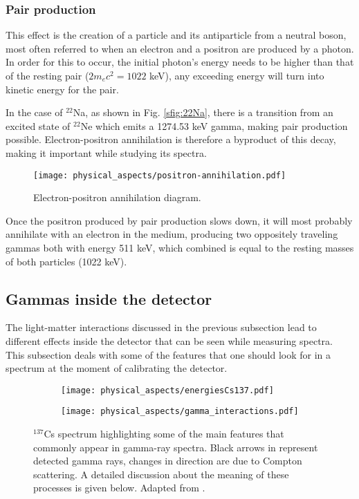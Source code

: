 \subsubsection{Pair production}

This effect is the creation of a particle and its antiparticle from a neutral boson, most often referred to when an electron and a positron are produced by a photon. In order for this to occur, the initial photon's energy needs to be higher than that of the resting pair ($2m_e c^2=1022$ \unit{\kilo\eV}), any exceeding energy will turn into kinetic energy for the pair.

In the case of $^{22}$Na, as shown in Fig. \ref{sfig:22Na}, there is a transition from an excited state of $^{22}$Ne which emits a 1274.53 \unit{\kilo\eV} gamma, making pair production possible. Electron-positron annihilation is therefore a byproduct of this decay, making it important while studying its spectra.

\begin{figure}[H]
  \centering
  \texttt{[image: physical\_aspects/positron-annihilation.pdf]}
  \caption{\label{fig:positron_annihilation_diagram}Electron-positron annihilation diagram.}
\end{figure}

Once the positron produced by pair production slows down, it will most probably annihilate with an electron in the medium, producing two oppositely traveling gammas both with energy 511 \unit{\kilo\eV}, which combined is equal to the resting masses of both particles (1022 \unit{\kilo\eV}).

\subsection{Gammas inside the detector}

The light-matter interactions discussed in the previous subsection lead to different effects inside the detector that can be seen while measuring spectra. This subsection deals with some of the features that one should look for in a spectrum at the moment of calibrating the detector.

\begin{figure}[H]
  \centering
  \begin{subfigure}[t]{0.7\textwidth}
    \texttt{[image: physical\_aspects/energiesCs137.pdf]}
    \caption{\label{sfig:spectrum_description}}
  \end{subfigure}
  \hfill
  \begin{subfigure}[t]{0.28\textwidth}
    \texttt{[image: physical\_aspects/gamma\_interactions.pdf]}
    \caption{\label{sfig:gamma_scattering}}
  \end{subfigure}
  \caption{\label{fig:Cs137_description}$^{137}$Cs spectrum highlighting some of the main features that commonly appear in gamma-ray spectra. Black arrows in  represent detected gamma rays, changes in direction are due to Compton scattering. A detailed discussion about the meaning of these processes is given below. Adapted from \cite{Notas-instrumentacion}.}
\end{figure}

